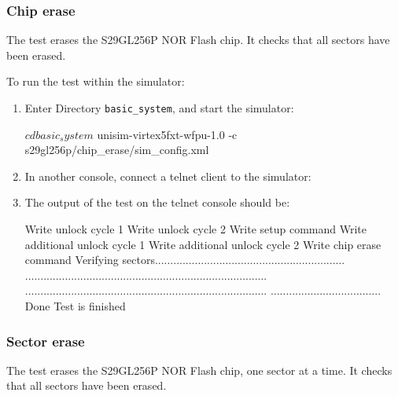 \subsubsection{Chip erase}

The test erases the S29GL256P NOR Flash chip.
It checks that all sectors have been erased.

\noindent To run the test within the simulator:
\begin{enumerate}
\item Enter Directory \texttt{basic\_system}, and start the simulator:
\begin{script}
$ cd basic_system
$ unisim-virtex5fxt-wfpu-1.0 -c s29gl256p/chip_erase/sim_config.xml
\end{script}
\item In another console, connect a telnet client to the simulator:
\item The output of the test on the telnet console should be:
\begin{script}
Write unlock cycle 1
Write unlock cycle 2
Write setup command
Write additional unlock cycle 1
Write additional unlock cycle 2
Write chip erase command
Verifying sectors..............................................................
...............................................................................
...............................................................................
....................................
Done
Test is finished
\end{script}

\end{enumerate}

\subsubsection{Sector erase}

The test erases the S29GL256P NOR Flash chip, one sector at a time.
It checks that all sectors have been erased.

